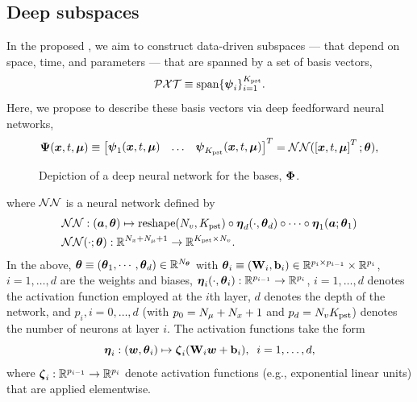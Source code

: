 \documentclass[3p,computermodern,10pt]{elsarticle}
\begin{document}
\subsection{Deep subspaces}
In the proposed \MLSubspaceNameLowercase, we aim to construct data-driven subspaces --- that depend on space, time, and parameters --- that are spanned by a set of basis vectors, 
$$\mathcal{PXT} \equiv \text{span}\{\boldsymbol \psi_i\}_{i=1}^{K_{\text{pst}}}.$$
Here, we propose to describe these basis vectors via deep feedforward neural networks,
$$\boldsymbol \Psi (\boldsymbol x, t,\boldsymbol \mu)\equiv \begin{bmatrix} \boldsymbol \psi_1(\boldsymbol x, t,\boldsymbol \mu) &
\hdots & 
 \boldsymbol \psi_{K_{\text{pst}}}(\boldsymbol x, t,\boldsymbol \mu) \end{bmatrix}^T
= \mathcal{NN}(\left[\boldsymbol x, t,\boldsymbol \mu\right]^T;\boldsymbol \theta),
$$
\begin{figure}
\begin{center}

\caption{Depiction of a deep neural network for the bases, $\boldsymbol \Phi$.}
\end{center}
\end{figure}
where $\mathcal{NN}$ is a neural network defined by
\begin{align}
&\mathcal{NN} : (\boldsymbol a,\boldsymbol \theta) \mapsto    \text{reshape}(N_v,K_{\text{pst}}) \circ \boldsymbol \eta_d(\cdot,\boldsymbol \theta_d) \circ \cdots \circ \boldsymbol \eta_1(\boldsymbol a; \boldsymbol \theta_1) \\
&\mathcal{NN}(\cdot;\boldsymbol \theta) : \mathbb{R}^{N_x + N_{\mu} + 1} \rightarrow \mathbb{R}^{K_{\text{pst}} \times N_v}.
\end{align}
In the above, $\boldsymbol \theta \equiv (\boldsymbol \theta_1,\cdots,\boldsymbol \theta_d) \in \mathbb{R}^{N_{\boldsymbol \theta}}$ with $\boldsymbol \theta_i \equiv (\mathbf{W}_i,\mathbf{b}_i) \in \mathbb{R}^{p_i \times p_{i-1}} \times \mathbb{R}^{p_i}$, $i=1,\ldots,d$ are the weights and biases, $\boldsymbol \eta_i(\cdot,\boldsymbol \theta_i) : \mathbb{R}^{p_{i-1}} \rightarrow \mathbb{R}^{p_i}$, $i=1,\ldots,d$ denotes the activation function employed at the $i$th layer,
 $d$ denotes the depth of the network, and $p_i, i=0,\ldots,d$ (with $p_0 = N_{\mu} + N_x + 1$ and $p_d = N_v K_{\text{pst}}$) denotes the number of neurons at layer $i$. The activation functions take the form
$$\boldsymbol \eta_i: (\boldsymbol w, \boldsymbol \theta_i) \mapsto \boldsymbol \zeta_i(\mathbf{W}_i \boldsymbol w + \mathbf{b}_i), \; \; i=1,\ldots,d,$$
where $\boldsymbol \zeta_i : \mathbb{R}^{p_{i-1}} \rightarrow \mathbb{R}^{p_i}$ denote activation functions (e.g., exponential linear units) that are applied elementwise.  
\end{document}
